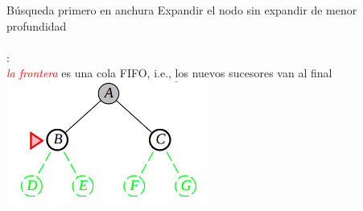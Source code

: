 \begin{frame}{B\'usqueda primero en anchura}
    Expandir el nodo sin expandir de menor profundidad\\~\\
    :\\
    \quad\textcolor{red}{\textit{la frontera}} es una cola FIFO, i.e., los nuevos sucesores van al final
    \centering
    \includegraphics[width=0.5\textwidth]{34_image_bfs2.PNG}

\end{frame}
